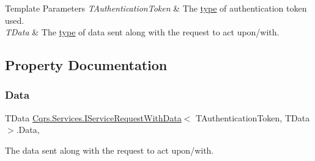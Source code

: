 \begin{DoxyTemplParams}{Template Parameters}
{\em T\+Authentication\+Token} & The \hyperlink{}{type} of authentication token used.\\
\hline
{\em T\+Data} & The \hyperlink{}{type} of data sent along with the request to act upon/with.\\
\hline
\end{DoxyTemplParams}


\subsection{Property Documentation}
\mbox{\label{interfaceCqrs_1_1Services_1_1IServiceRequestWithData_a6d2d68c5e99b9be14d2a0ee800eb87f3_a6d2d68c5e99b9be14d2a0ee800eb87f3}} 
\subsubsection{\texorpdfstring{Data}{Data}}
{\footnotesize\ttfamily T\+Data \hyperlink{interfaceCqrs_1_1Services_1_1IServiceRequestWithData}{Cqrs.\+Services.\+I\+Service\+Request\+With\+Data}$<$ T\+Authentication\+Token, T\+Data $>$.Data\hspace{0.3cm}{\ttfamily [get]}, {\ttfamily [set]}}



The data sent along with the request to act upon/with. 


